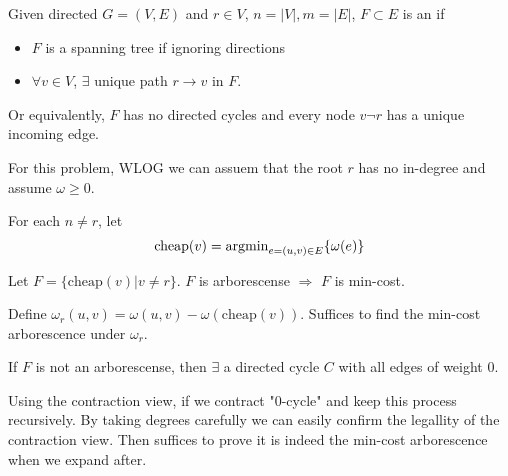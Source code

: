 \begin{definition}
    Given directed  $ G=(V,E)  $ and  $ r\in V  $,  $ n=|V|,m=|E| $,  $ F\subset E $ is an  if 
    \begin{itemize}
        \item  $ F $ is a spanning tree if ignoring directions
        \item   $ \forall v\in V $,  $ \exists $ unique  path  $ r\rightarrow v $ in  $ F $.    
    \end{itemize}  
    Or equivalently,  $ F $ has no directed cycles and every node  $ v\neg r $ has a unique incoming edge.  
\end{definition}

For this problem, WLOG we can assuem that the root  $ r $  has no in-degree and assume  $ \omega \geq 0 $.  

\newcommand{\cheap}{\mathrm{cheap}}
For each  $ n\neq r $, let 
\[\mathrm{cheap}(v)=\operatorname{argmin}_{e=(u,v)\in E}\{\omega(e)\}\] 
\begin{claim}
    Let  $ F=\{\cheap(v)|v\neq r\} $.  $ F $ is arborescense $ \Rightarrow  $  $ F $ is min-cost.   
\end{claim}

Define  $ \omega_r(u,v)=\omega(u,v)-\omega(\cheap(v)) $. Suffices to find the min-cost arborescence under  $ \omega_r $. 

If  $ F $ is not an arborescense, then  $ \exists $ a directed cycle  $ C $ with all edges of weight  $ 0 $.    


Using the contraction view, if we contract "$ 0 $-cycle" and keep this process recursively. By taking degrees carefully we can easily confirm the legallity of the contraction view. Then suffices to prove it is indeed the min-cost arborescence when we expand after.

